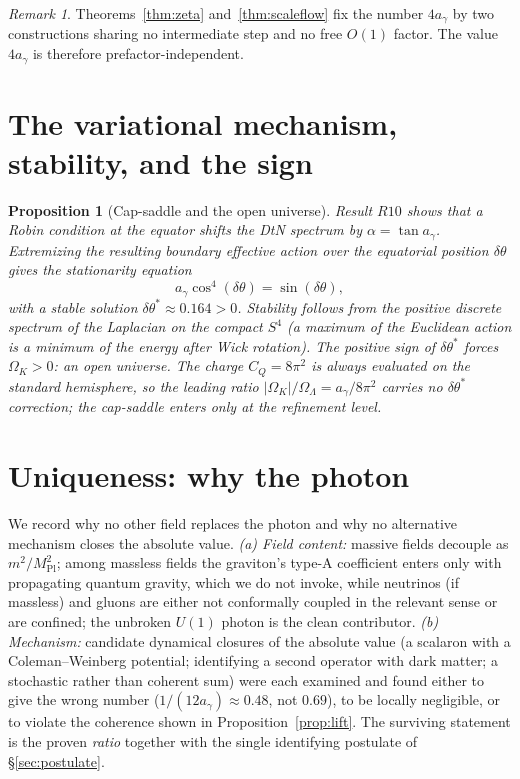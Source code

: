 \documentclass[11pt,a4paper]{article}
\newtheorem{proposition}{Proposition}
\theoremstyle{definition}
\theoremstyle{remark}
\newtheorem{remark}{Remark}
\newcommand{\ag}{a_\gamma}
\newcommand{\CQ}{C_Q}
\newcommand{\Ok}{\Omega_K}
\newcommand{\OL}{\Omega_\Lambda}
\newcommand{\Mpl}{M_{\mathrm{Pl}}}
\begin{document}
\begin{remark}
Theorems~\ref{thm:zeta} and~\ref{thm:scaleflow} fix the number $4\ag$ by two constructions sharing
no intermediate step and no free $O(1)$ factor. The value $4\ag$ is therefore prefactor-independent.
\end{remark}

\section{The variational mechanism, stability, and the sign}\label{sec:cap}
\begin{proposition}[Cap-saddle and the open universe]\label{prop:sign}
Result $R10$ shows that a Robin condition at the equator shifts the DtN spectrum by
$\alpha=\tan\ag$. Extremizing the resulting boundary effective action over the equatorial position
$\delta\theta$ gives the stationarity equation
\[
\ag\cos^4(\delta\theta)=\sin(\delta\theta),
\]
with a stable solution $\delta\theta^*\approx0.164>0$. Stability follows from the positive discrete
spectrum of the Laplacian on the compact $S^4$ (a maximum of the Euclidean action is a minimum of
the energy after Wick rotation). The positive sign of $\delta\theta^*$ forces $\Ok>0$: an
\emph{open} universe. The charge $\CQ=8\pi^2$ is always evaluated on the standard hemisphere, so the
leading ratio $\lvert\Ok\rvert/\OL=\ag/8\pi^2$ carries no $\delta\theta^*$ correction; the cap-saddle
enters only at the refinement level.
\end{proposition}

\section{Uniqueness: why the photon}\label{sec:uniq}
We record why no other field replaces the photon and why no alternative mechanism closes the
absolute value. \emph{(a) Field content:} massive fields decouple as $m^2/\Mpl^2$; among massless
fields the graviton's type-A coefficient enters only with propagating quantum gravity, which we do
not invoke, while neutrinos (if massless) and gluons are either not conformally coupled in the
relevant sense or are confined; the unbroken $U(1)$ photon is the clean contributor. \emph{(b)
Mechanism:} candidate dynamical closures of the absolute value (a scalaron with a
Coleman--Weinberg potential; identifying a second operator with dark matter; a stochastic rather
than coherent sum) were each examined and found either to give the wrong number
($1/(12\ag)\approx0.48$, not $0.69$), to be locally negligible, or to violate the coherence shown
in Proposition~\ref{prop:lift}. The surviving statement is the proven \emph{ratio} together with the
single identifying postulate of \S\ref{sec:postulate}.
\end{document}
